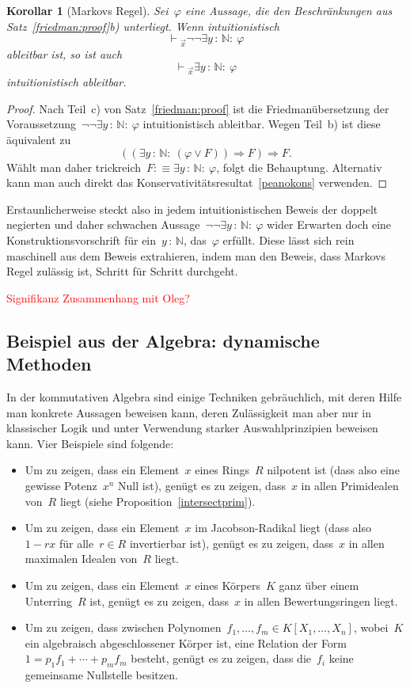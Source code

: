 \documentclass[a4paper,ngerman,12pt]{scrartcl}
\theoremstyle{definition}
\theoremstyle{plain}
\newtheorem{kor}[defn]{Korollar}
\theoremstyle{remark}
\newcommand{\NN}{\mathbb{N}}
\newcommand{\seq}[1]{\mathrel{\vdash\!\!\!_{#1}}}
\renewcommand{\_}{\mathpunct{.}\,}
\newcommand{\?}{\,{:}\,}
\newcommand{\XXX}[1]{\textcolor{red}{#1}}
\begin{document}
\begin{kor}[Markovs Regel]Sei~$\varphi$ eine Aussage, die den Beschränkungen
aus Satz~\ref{friedman:proof}b) unterliegt. Wenn intuitionistisch
\[ \seq{\vec x} \neg\neg\exists y\?\NN{:}\ \varphi \]
ableitbar ist, so ist auch
\[ \seq{\vec x} \exists y\?\NN{:}\ \varphi \]
intuitionistisch ableitbar.\end{kor}
\begin{proof}Nach Teil~c) von Satz~\ref{friedman:proof} ist die
Friedmanübersetzung der Voraussetzung~$\neg\neg\exists
y\?\NN{:}\ \varphi$ intuitionistisch ableitbar. Wegen Teil~b) ist diese äquivalent zu
\[ ((\exists y\?\NN{:}\ (\varphi \vee F)) \Rightarrow F) \Rightarrow F. \]
Wählt man daher trickreich~$F :\equiv \exists y\?\NN{:}\ \varphi$, folgt die Behauptung.
Alternativ kann man auch direkt das Konservativitätsresultat~\ref{peanokons}
verwenden.
\end{proof}

Erstaunlicherweise steckt also in jedem intuitionistischen Beweis der doppelt
negierten und daher schwachen Aussage~$\neg\neg \exists y\?\NN{:}\ \varphi$
wider Erwarten doch eine Konstruktionsvorschrift für ein~$y\?\NN$, das~$\varphi$
erfüllt. Diese lässt sich rein maschinell aus dem Beweis extrahieren, indem man
den Beweis, dass Markovs Regel zulässig ist, Schritt für Schritt durchgeht.

\XXX{Signifikanz}
\XXX{Zusammenhang mit Oleg?}


\subsection{Beispiel aus der Algebra: dynamische Methoden}

In der kommutativen Algebra sind einige Techniken gebräuchlich, mit deren Hilfe
man konkrete Aussagen beweisen kann, deren Zulässigkeit man aber nur
in klassischer Logik und unter Verwendung starker Auswahlprinzipien beweisen
kann. Vier Beispiele sind folgende:

\begin{itemize}
\item Um zu zeigen, dass ein Element~$x$ eines Rings~$R$ nilpotent ist (dass
also eine gewisse Potenz~$x^n$ Null ist), genügt es zu zeigen, dass~$x$ in
allen Primidealen von~$R$ liegt (siehe Proposition~\ref{intersectprim}).
\item Um zu zeigen, dass ein Element~$x$ im Jacobson-Radikal liegt (dass
also~$1-rx$ für alle~$r \in R$ invertierbar ist), genügt es zu zeigen, dass~$x$
in allen maximalen Idealen von~$R$ liegt.
\item Um zu zeigen, dass ein Element~$x$ eines Körpers~$K$ ganz über einem
Unterring~$R$ ist, genügt es zu zeigen, dass~$x$ in allen Bewertungsringen
liegt.
\item Um zu zeigen, dass zwischen Polynomen~$f_1,\ldots,f_m \in
K[X_1,\ldots,X_n]$, wobei~$K$ ein algebraisch abgeschlossener Körper ist, eine
Relation der Form~$1 = p_1 f_1 + \cdots + p_m f_m$ besteht, genügt es zu
zeigen, dass die~$f_i$ keine gemeinsame Nullstelle besitzen.
\end{itemize}
\end{document}
